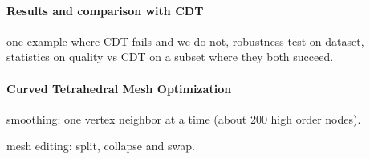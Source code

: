 \paragraph{Results and comparison with CDT} 


one example where CDT fails and we do not, robustness test on dataset, statistics on quality vs CDT on a subset where they both succeed.

\paragraph{Curved Tetrahedral Mesh Optimization}
smoothing: one vertex neighbor at a time (about 200 high order nodes).

mesh editing: split, collapse and swap.

